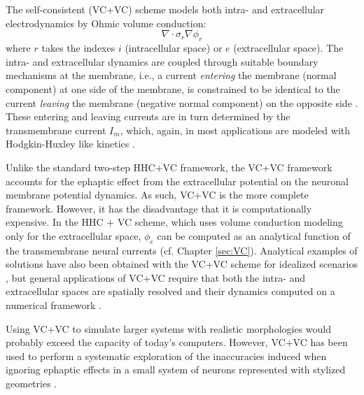


\section{}
The self-consistent (VC+VC) scheme models both intra- and extracellular electrodynamics by Ohmic volume conduction:
\begin{equation}
\nabla \cdot \sigma_r \nabla \phi_r
\end{equation}
where $r$ takes the indexes $i$ (intracellular space) or $e$ (extracellular space). The intra- and extracellular dynamics are coupled through suitable boundary mechanisms at the membrane, i.e., a current \textit{entering} the membrane (normal component) at one side of the membrane, is constrained to be identical to the current \textit{leaving} the membrane (negative normal component) on the opposite side  \cite{Krassowska1994}. These entering and leaving currents are in turn determined by the transmembrane current $I_m$, which, again, in most applications are modeled with Hodgkin-Huxley like kinetics \cite{Agudelo-Toro2013, Tveito2017}. 

Unlike the standard two-step HHC+VC framework, the VC+VC framework accounts for the ephaptic effect  from the extracellular potential on the neuronal membrane potential dynamics. As such, VC+VC is the more complete framework. However, it has the disadvantage that it is computationally expensive. In the HHC + VC scheme, which uses volume conduction modeling only for the extracellular space, $\phi_e$ can be computed as an analytical function of the transmembrane neural currents (cf. Chapter \ref{sec:VC}). Analytical examples of solutions have also been obtained with the VC+VC scheme for idealized scenarios 
 \cite{Krassowska1994}, but general applications of VC+VC require that both the intra- and extracellular spaces are spatially resolved and their dynamics computed on a numerical framework \cite{Agudelo-Toro2013, Tveito2017}. 

Using VC+VC to simulate larger systems with realistic morphologies would probably exceed the capacity of today's computers. However, VC+VC has been used to perform a systematic exploration of the inaccuracies induced when ignoring ephaptic effects in a small system of neurons represented with stylized geometries  \cite{Tveito2019}.




